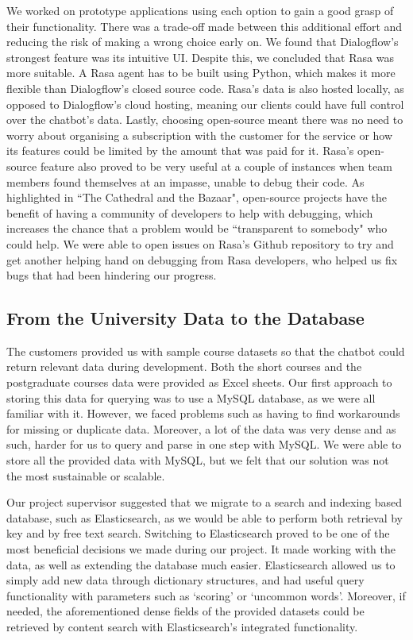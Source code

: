 \documentclass{l3proj}
\begin{document}
We worked on prototype applications using each option to gain a good grasp of their functionality. There was a trade-off made between this additional effort and reducing the risk of making a wrong choice early on. We found that Dialogflow's strongest feature was its intuitive UI. Despite this, we concluded that Rasa was more suitable. A Rasa agent has to be built using Python, which makes it more flexible than Dialogflow's closed source code. Rasa's data is also hosted locally, as opposed to Dialogflow's cloud hosting, meaning our clients could have full control over the chatbot's data. Lastly, choosing open-source meant there was no need to worry about organising a subscription with the customer for the service or how its features could be limited by the amount that was paid for it. Rasa's open-source feature also proved to be very useful at a couple of instances when team members found themselves at an impasse, unable to debug their code. As highlighted in ``The Cathedral and the Bazaar", open-source projects have the benefit of having a community of developers to help with debugging, which increases the chance that a problem would be ``transparent to somebody" who could help\cite{cathedral:Raymond}. We were able to open issues on Rasa's Github repository to try and get another helping hand on debugging from Rasa developers, who helped us fix bugs that had been hindering our progress.

\subsection{From the University Data to the Database}

The customers provided us with sample course datasets so that the chatbot could return relevant data during development. Both the short courses and the postgraduate courses data were provided as Excel sheets. Our first approach to storing this data for querying was to use a MySQL database, as we were all familiar with it. However, we faced problems such as having to find workarounds for missing or duplicate data. Moreover, a lot of the data was very dense and as such, harder for us to query and parse in one step with MySQL. We were able to store all the provided data with MySQL, but we felt that our solution was not the most sustainable or scalable.

Our project supervisor suggested that we migrate to a search and indexing based database, such as Elasticsearch, as we would be able to perform both retrieval by key and by free text search. Switching to Elasticsearch proved to be one of the most beneficial decisions we made during our project. It made working with the data, as well as extending the database much easier. Elasticsearch allowed us to simply add new data through dictionary structures, and had useful query functionality with parameters such as `scoring' or `uncommon words'. Moreover, if needed, the aforementioned dense fields of the provided datasets could be retrieved by content search with Elasticsearch's integrated functionality\cite{elasticsearch}.
\end{document}
